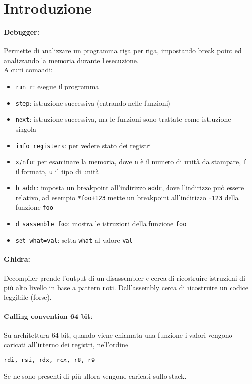 
\section{Introduzione}

\paragraph{Debugger:} Permette di analizzare un programma riga per riga, impostando break point ed analizzando la memoria durante l'esecuzione.\\

Alcuni comandi: 
\begin{itemize}
	\item \texttt{run r}: esegue il programma
	\item \texttt{step}: istruzione successiva (entrando nelle funzioni)
	\item \texttt{next}: istruzione successiva, ma le funzioni sono trattate come istruzione singola 
	\item \texttt{info registers}: per vedere stato dei registri
	\item \texttt{x/nfu}: per esaminare la memoria, dove \texttt{n} è il numero di unità da stampare, \texttt{f} il formato, \texttt{u} il tipo di unità
	\item \texttt{b addr}: imposta un breakpoint all'indirizzo \texttt{addr}, dove l'indirizzo può essere relativo, ad esempio \texttt{*foo+123} mette un breakpoint all'indirizzo \texttt{+123} della funzione \texttt{foo}
	\item \texttt{disassemble foo}: mostra le istruzioni della funzione \texttt{foo}
	\item \texttt{set what=val}: setta \texttt{what} al valore \texttt{val}
\end{itemize}

\paragraph{Ghidra:} Decompiler prende l'output di un disassembler e cerca di ricostruire istruzioni di più alto livello in base a pattern noti. Dall'assembly cerca di ricostruire un codice leggibile (forse).\\

\paragraph{Calling convention 64 bit:} Su architettura 64 bit, quando viene chiamata una funzione i valori vengono caricati all'interno dei registri, nell'ordine
\begin{center}
	\texttt{rdi, rsi, rdx, rcx, r8, r9}
\end{center}
Se ne sono presenti di più allora vengono caricati sullo stack.\\

